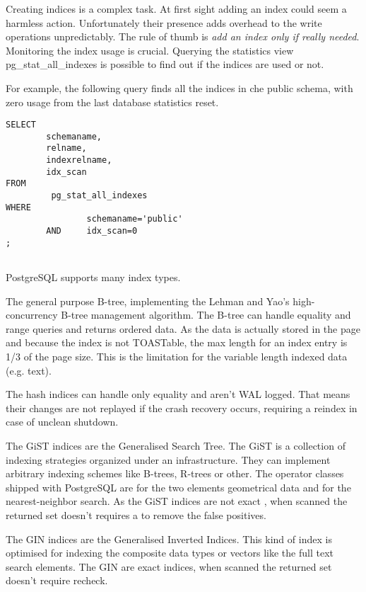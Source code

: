 Creating indices is a complex task. At first sight adding an index could seem a 
harmless action. Unfortunately their presence adds overhead to the write 
operations unpredictably. The rule of thumb is \textit{add an index only 
if really needed}. Monitoring the index usage is crucial. Querying the 
statistics view pg\_stat\_all\_indexes is possible to find out if the indices 
are used or not.

For example, the following query finds all the indices in che public 
schema, with zero usage from the last database statistics reset.

\begin{verbatim}
SELECT
        schemaname,
        relname,
        indexrelname,
        idx_scan
FROM
         pg_stat_all_indexes
WHERE
                schemaname='public'
        AND     idx_scan=0
;


\end{verbatim}



PostgreSQL supports many index types. 

The general purpose B-tree, implementing the Lehman and 
Yao's high-concurrency B-tree management algorithm. The B-tree can handle 
equality and range queries and returns ordered data. As the data is actually 
stored in the page and because the index is not TOASTable, the max length for an 
index entry is 1/3 of the page size. This is the limitation for the variable 
length indexed data (e.g. text). \newline

The hash indices can handle only equality and aren't WAL 
logged. That means their changes are not replayed if the crash recovery occurs, 
requiring a reindex in case of unclean shutdown.\newline

The GiST indices are the Generalised Search Tree. The GiST 
is a collection of indexing strategies organized under an 
infrastructure. They can implement arbitrary indexing schemes like B-trees, 
R-trees  or other. The operator classes shipped with PostgreSQL are for the two 
elements geometrical data and for the nearest-neighbor search. As the GiST 
indices are not exact , when scanned the returned set doesn't requires a to 
remove the false positives.\newline

The GIN indices  are the Generalised Inverted Indices. This 
kind of index is optimised for indexing the composite data types or vectors 
like the full text search elements. The GIN are exact indices, when scanned the 
returned set doesn't require recheck.

